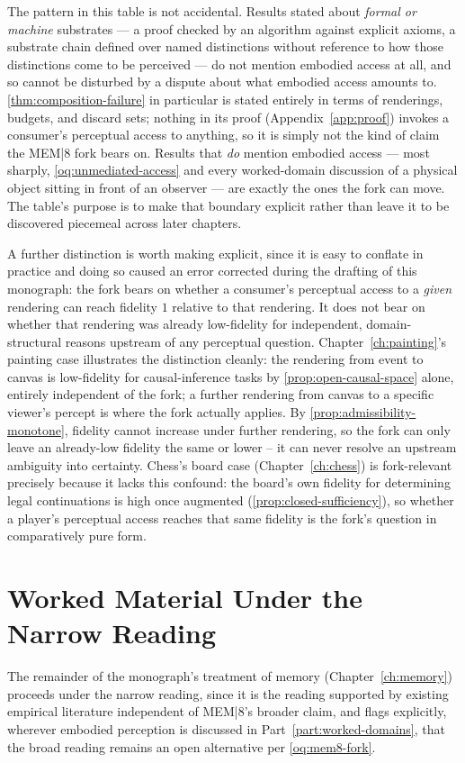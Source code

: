 The pattern in this table is not accidental. Results stated about
\emph{formal or machine} substrates --- a proof checked by an algorithm
against explicit axioms, a substrate chain defined over named
distinctions without reference to how those distinctions come to be
perceived --- do not mention embodied access at all, and so cannot be
disturbed by a dispute about what embodied access amounts to.
\cref{thm:composition-failure} in particular is stated entirely in terms
of renderings, budgets, and discard sets; nothing in its proof
(Appendix~\ref{app:proof}) invokes a consumer's perceptual access to
anything, so it is simply not the kind of claim the MEM|8 fork bears on.
Results that \emph{do} mention embodied access --- most sharply,
\cref{oq:unmediated-access} and every worked-domain discussion of a
physical object sitting in front of an observer --- are exactly the ones
the fork can move. The table's purpose is to make that boundary explicit
rather than leave it to be discovered piecemeal across later chapters.

\begin{remark}
\label{rem:fork-scope}
A further distinction is worth making explicit, since it is easy to
conflate in practice and doing so caused an error corrected during the
drafting of this monograph: the fork bears on whether a consumer's
perceptual access to a \emph{given} rendering can reach fidelity $1$
relative to that rendering. It does not bear on whether that rendering
was already low-fidelity for independent, domain-structural reasons
upstream of any perceptual question. Chapter~\ref{ch:painting}'s
painting case illustrates the distinction cleanly: the rendering from
event to canvas is low-fidelity for causal-inference tasks by
\cref{prop:open-causal-space} alone, entirely independent of the fork; a
further rendering from canvas to a specific viewer's percept is where
the fork actually applies. By \cref{prop:admissibility-monotone},
fidelity cannot increase under further rendering, so the fork can only
leave an already-low fidelity the same or lower -- it can never resolve
an upstream ambiguity into certainty. Chess's board case
(Chapter~\ref{ch:chess}) is fork-relevant precisely because it lacks
this confound: the board's own fidelity for determining legal
continuations is high once augmented (\cref{prop:closed-sufficiency}),
so whether a player's perceptual access reaches that same fidelity is
the fork's question in comparatively pure form.
\end{remark}

\section{Worked Material Under the Narrow Reading}

The remainder of the monograph's treatment of memory
(Chapter~\ref{ch:memory}) proceeds under the narrow reading, since it is
the reading supported by existing empirical literature independent of
MEM|8's broader claim, and flags explicitly, wherever embodied perception
is discussed in Part~\ref{part:worked-domains}, that the broad reading
remains an open alternative per \cref{oq:mem8-fork}.
